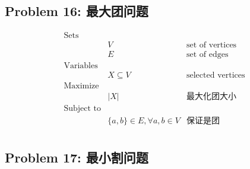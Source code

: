 \documentclass[11pt]{article}
\begin{document}
\newpage
\subsection*{Problem 16: 最大团问题}

\begin{eqnarray*}
    \textrm{Sets} \\
        & V & \textrm{set of vertices} \\
        & E & \textrm{set of edges} \\
    \textrm{Variables} \\
        & X \subseteq V & \textrm{selected vertices} \\
    \textrm{Maximize} \\
        & \displaystyle |X| & \textrm{最大化团大小} \\
    \textrm{Subject to} \\
        & \{a, b\} \in E, \forall a, b \in V & \textrm{保证是团} \\ 
\end{eqnarray*}


\newpage
\subsection*{Problem 17: 最小割问题}
\end{document}
